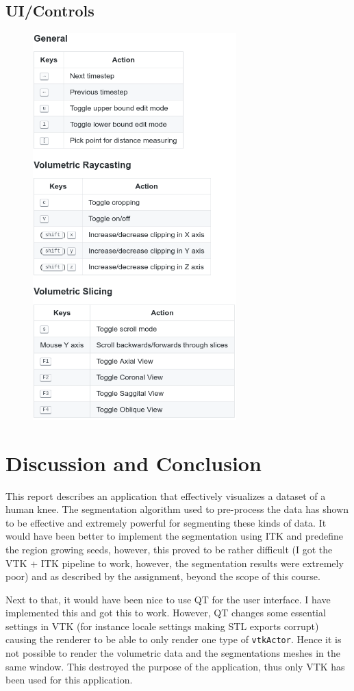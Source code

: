 \documentclass{article}
\begin{document}
\subsection{UI/Controls}
\begin{figure}[H]
    \centering
    \includegraphics[width=0.7\textwidth]{graphics/controls.png}
\end{figure}

\section{Discussion and Conclusion}
This report describes an application that effectively visualizes a dataset of a human knee. The segmentation algorithm used to pre-process the data has shown to be effective and extremely powerful for segmenting these kinds of data. It would have been better to implement the segmentation using ITK and predefine the region growing seeds, however, this proved to be rather difficult (I got the VTK + ITK pipeline to work, however, the segmentation results were extremely poor) and as described by the assignment, beyond the scope of this course.

Next to that, it would have been nice to use QT for the user interface. I have implemented this and got this to work. However, QT changes some essential settings in VTK (for instance locale settings making STL exports corrupt) causing the renderer to be able to only render one type of \texttt{vtkActor}. Hence it is not possible to render the volumetric data and the segmentations meshes in the same window. This destroyed the purpose of the application, thus only VTK has been used for this application.
\end{document}
